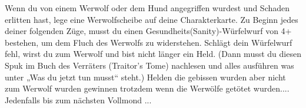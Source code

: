 
Wenn du von einem Werwolf oder dem Hund angegriffen wurdest und Schaden erlitten hast, lege eine Werwolfscheibe auf deine Charakterkarte. Zu Beginn jedes deiner folgenden Züge, musst du einen Gesundheits(Sanity)-Würfelwurf von 4+ bestehen, um dem Fluch des Werwolfs zu widerstehen. Schlägt dein Würfelwurf fehl, wirst du zum Werwolf und bist nicht länger ein Held. (Dann musst du diesen Spuk im Buch des Verräters (Traitor's Tome) nachlesen und alles ausführen was unter „Was du jetzt tun musst“ steht.)
Helden die gebissen wurden aber nicht zum Werwolf wurden gewinnen trotzdem wenn die Werwölfe getötet wurden.... Jedenfalls bis zum nächsten Vollmond ...


